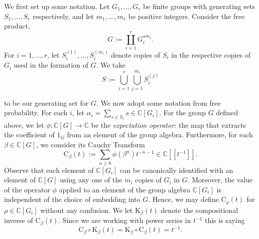 \documentclass[11pt]{amsart}
\theoremstyle{definition}
\newcommand{\C}{\mathbb{C}}
\newcommand{\CT}{\mathrm{C}}
\newcommand{\invCT}{\mathrm{K}}
\begin{document}
We first set up some notation. Let $G_1,\ldots, G_r$ be finite groups with generating sets $S_1,\ldots ,S_r$ respectively, and let $m_1,\ldots ,m_r$ be positive integers. Consider the free product, 
$$G:=\coprod_{i=1}^r G_i^{\star m_i}.$$ 
For $i=1,\hdots,r$, let $S_i^{(1)},\ldots , S_i^{(m_i)}$ denote copies of $S_i$ in the respective copies of $G_i$ used in the formation of $G$. We take
\begin{equation}
S:=\bigcup_{i=1}^r \bigcup_{j=1}^{m_i} S_i^{(j)}\end{equation}

to be our generating set for $G$. We now adopt some notation from free probability. For each $i$, let $\alpha_i = \sum_{s\in S_i} s \in \mathbb{C}[G_i]$. For the group $G$ defined above, we let $\phi: \mathbb{C}[G]\to \mathbb{C}$ be the \emph{expectation operator}: the map that extracts the coefficient of $1_G$ from an element of the group algebra. Furthermore, for each $\beta\in \C[G]$, we consider its Cauchy Transform 
$$\CT_{\beta}(t):=\sum_{n\ge 0}\phi(\beta^n)t^{-n-1}\in \mathbb{C}[[t^{-1}]].$$ 
Observe that each element of $\C[G_i]$ can be canonically identified with an element of $\C[G]$ using any one of the $m_i$ copies of $G_i$ in $G$. Moreover, the value of the operator $\phi$ applied to an element of the group algebra $\C[G_i]$ is independent of the choice of embedding into $G$.  Hence, we may define $\CT_{\rho}(t)$ for $\rho\in \C[G_i]$ without any confusion. We let $\invCT_{\beta}(t)$ denote the compositional inverse of $\CT_{\beta}(t)$. Since we are working with power series in $t^{-1}$ this is saying
\begin{equation}\label{eq:inv}
\CT_{\beta}\circ \invCT_{\beta}(t) = \invCT_{\beta}\circ \CT_{\beta}(t) = t^{-1}.
\end{equation}
\end{document}
